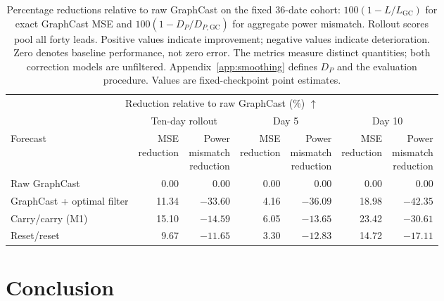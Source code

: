 \documentclass{article}
\newcommand{\vfourred}[1]{{\color{red}#1}}
\begin{document}
\begin{table}[!htbp]
    \centering
    \begingroup\color{red}\small
    \setlength{\tabcolsep}{4pt}
    \begin{tabular}{lrrrrrr}
        \toprule
        \multicolumn{7}{c}{Reduction relative to raw GraphCast (\%) $\uparrow$} \\
        \addlinespace[2pt]
        & \multicolumn{2}{c}{Ten-day rollout} & \multicolumn{2}{c}{Day 5} & \multicolumn{2}{c}{Day 10} \\
        \cmidrule(lr){2-3}\cmidrule(lr){4-5}\cmidrule(lr){6-7}
        Forecast & \shortstack{MSE\\reduction} & \shortstack{Power\\mismatch\\reduction} & \shortstack{MSE\\reduction} & \shortstack{Power\\mismatch\\reduction} & \shortstack{MSE\\reduction} & \shortstack{Power\\mismatch\\reduction} \\
        \midrule
        Raw GraphCast & 0.00 & 0.00 & 0.00 & 0.00 & 0.00 & 0.00 \\
        GraphCast + optimal filter & 11.34 & $-33.60$ & 4.16 & $-36.09$ & 18.98 & $-42.35$ \\
        Carry/carry (M1) & 15.10 & $-14.59$ & 6.05 & $-13.65$ & 23.42 & $-30.61$ \\
        Reset/reset & 9.67 & $-11.65$ & 3.30 & $-12.83$ & 14.72 & $-17.11$ \\
        \bottomrule
    \end{tabular}
    \endgroup
    \caption{\vfourred{Percentage reductions relative to raw GraphCast on the fixed 36-date cohort: $100(1-L/L_{\mathrm{GC}})$ for exact GraphCast MSE and $100(1-D_P/D_{P,\mathrm{GC}})$ for aggregate power mismatch. Rollout scores pool all forty leads. Positive values indicate improvement; negative values indicate deterioration. Zero denotes baseline performance, not zero error. The metrics measure distinct quantities; both correction models are unfiltered. Appendix~\ref{app:smoothing} defines $D_P$ and the evaluation procedure. Values are fixed-checkpoint point estimates.}}
    \label{tab:smoothing_scores}
\end{table}

\FloatBarrier
\section{Conclusion}
\end{document}
